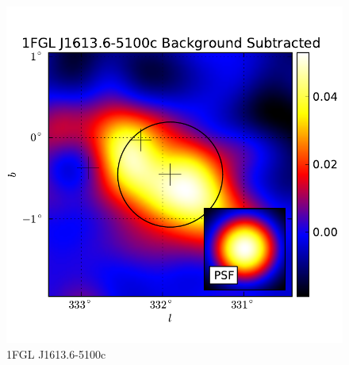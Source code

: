 \documentclass[preprint]{aastex}
\begin{document}
  \begin{figure}
    \begin{center}
      \includegraphics[type=pdf,ext=.pdf,read=.pdf]{source_plots/source_1FGL_J1613.6-5100c}
    \end{center}
    \caption{
    1FGL J1613.6-5100c }
  \end{figure}




  
\end{document}
